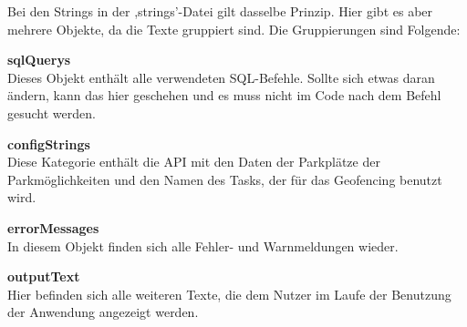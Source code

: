 Bei den Strings in der ,strings'-Datei gilt dasselbe Prinzip. Hier gibt es aber mehrere Objekte, da die Texte gruppiert sind. Die Gruppierungen sind Folgende:
\newpage
\begin{description}
	\item \textbf{sqlQuerys} \\ Dieses Objekt enthält alle verwendeten SQL-Befehle. Sollte sich etwas daran ändern, kann das hier geschehen und es muss nicht im Code nach dem Befehl gesucht werden.
	\item \textbf{configStrings} \\ Diese Kategorie enthält die API mit den Daten der Parkplätze der Parkmöglichkeiten und den Namen des Tasks, der für das Geofencing benutzt wird.
	\item \textbf{errorMessages} \\ In diesem Objekt finden sich alle Fehler- und Warnmeldungen wieder.
	\item \textbf{outputText} \\ Hier befinden sich alle weiteren Texte, die dem Nutzer im Laufe der Benutzung der Anwendung angezeigt werden.
\end{description}